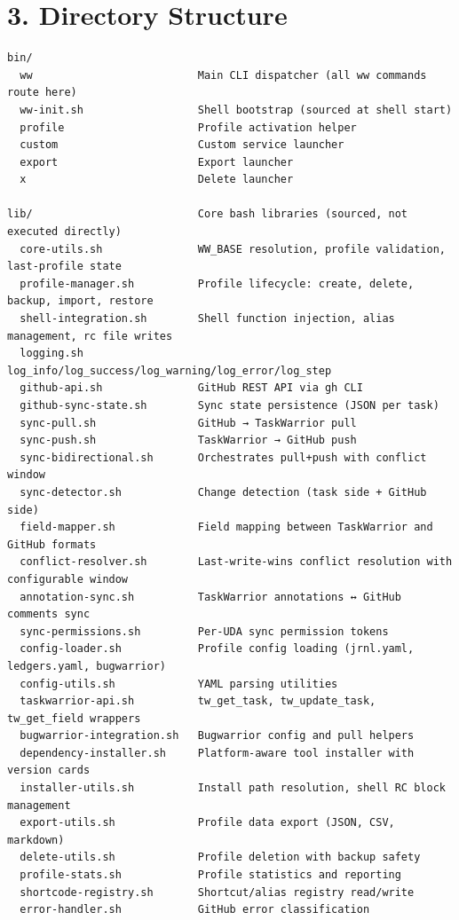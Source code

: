 \documentclass[11pt, a4paper, DIV=14]{scrartcl}
\begin{document}
\section{3. Directory Structure}\label{directory-structure}

\begin{verbatim}
bin/
  ww                          Main CLI dispatcher (all ww commands route here)
  ww-init.sh                  Shell bootstrap (sourced at shell start)
  profile                     Profile activation helper
  custom                      Custom service launcher
  export                      Export launcher
  x                           Delete launcher

lib/                          Core bash libraries (sourced, not executed directly)
  core-utils.sh               WW_BASE resolution, profile validation, last-profile state
  profile-manager.sh          Profile lifecycle: create, delete, backup, import, restore
  shell-integration.sh        Shell function injection, alias management, rc file writes
  logging.sh                  log_info/log_success/log_warning/log_error/log_step
  github-api.sh               GitHub REST API via gh CLI
  github-sync-state.sh        Sync state persistence (JSON per task)
  sync-pull.sh                GitHub → TaskWarrior pull
  sync-push.sh                TaskWarrior → GitHub push
  sync-bidirectional.sh       Orchestrates pull+push with conflict window
  sync-detector.sh            Change detection (task side + GitHub side)
  field-mapper.sh             Field mapping between TaskWarrior and GitHub formats
  conflict-resolver.sh        Last-write-wins conflict resolution with configurable window
  annotation-sync.sh          TaskWarrior annotations ↔ GitHub comments sync
  sync-permissions.sh         Per-UDA sync permission tokens
  config-loader.sh            Profile config loading (jrnl.yaml, ledgers.yaml, bugwarrior)
  config-utils.sh             YAML parsing utilities
  taskwarrior-api.sh          tw_get_task, tw_update_task, tw_get_field wrappers
  bugwarrior-integration.sh   Bugwarrior config and pull helpers
  dependency-installer.sh     Platform-aware tool installer with version cards
  installer-utils.sh          Install path resolution, shell RC block management
  export-utils.sh             Profile data export (JSON, CSV, markdown)
  delete-utils.sh             Profile deletion with backup safety
  profile-stats.sh            Profile statistics and reporting
  shortcode-registry.sh       Shortcut/alias registry read/write
  error-handler.sh            GitHub error classification


\end{verbatim}
\end{document}
